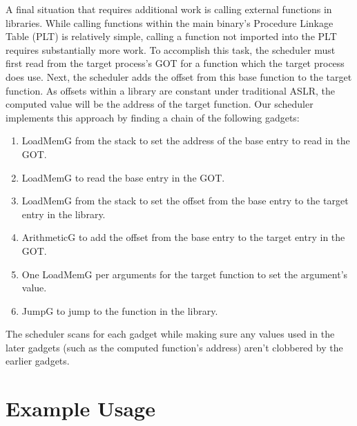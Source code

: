 \documentclass[journal]{IEEEtran}
\begin{document}
A final situation that requires additional work is calling external functions in libraries.
While calling functions within the main binary's Procedure Linkage Table (PLT) is relatively simple, calling a function not imported into the PLT requires substantially more work.
To accomplish this task, the scheduler must first read from the target process's GOT for a function which the target process does use.
Next, the scheduler adds the offset from this base function to the target function.
As offsets within a library are constant under traditional ASLR, the computed value will be the address of the target function.
Our scheduler implements this approach by finding a chain of the following gadgets:
\begin{enumerate}
  \item LoadMemG from the stack to set the address of the base entry to read in the GOT.
  \item LoadMemG to read the base entry in the GOT.
  \item LoadMemG from the stack to set the offset from the base entry to the target entry in the library.
  \item ArithmeticG to add the offset from the base entry to the target entry in the GOT.
  \item One LoadMemG per arguments for the target function to set the argument's value.
  \item JumpG to jump to the function in the library.
\end{enumerate}
The scheduler scans for each gadget while making sure any values used in the later gadgets (such as the computed function's address) aren't clobbered by the earlier gadgets.

\section{Example Usage}\label{examples}
\end{document}
